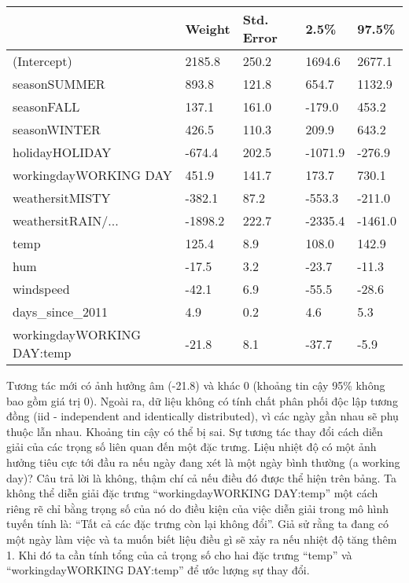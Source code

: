 \begin{table*}[!hbt]
\centering
\begin{tabular}{|l|l|l|l|l|}
\hline
                           & Weight  & Std. Error & 2.5\%   & 97.5\%  \\ \hline
(Intercept)                & 2185.8  & 250.2      & 1694.6  & 2677.1  \\ \hline
seasonSUMMER               & 893.8   & 121.8      & 654.7   & 1132.9  \\ \hline
seasonFALL                 & 137.1   & 161.0      & -179.0  & 453.2   \\ \hline
seasonWINTER               & 426.5   & 110.3      & 209.9   & 643.2   \\ \hline
holidayHOLIDAY             & -674.4  & 202.5      & -1071.9 & -276.9  \\ \hline
workingdayWORKING DAY      & 451.9   & 141.7      & 173.7   & 730.1   \\ \hline
weathersitMISTY            & -382.1  & 87.2       & -553.3  & -211.0  \\ \hline
weathersitRAIN/...         & -1898.2 & 222.7      & -2335.4 & -1461.0 \\ \hline
temp                       & 125.4   & 8.9        & 108.0   & 142.9   \\ \hline
hum                        & -17.5   & 3.2        & -23.7   & -11.3   \\ \hline
windspeed                  & -42.1   & 6.9        & -55.5   & -28.6   \\ \hline
days\_since\_2011          & 4.9     & 0.2        & 4.6     & 5.3     \\ \hline
workingdayWORKING DAY:temp & -21.8   & 8.1        & -37.7   & -5.9    \\ \hline
\end{tabular}
\end{table*}

Tương tác mới có ảnh hưởng âm (-21.8) và khác 0 (khoảng tin cậy 95\% không bao gồm giá trị 0). Ngoài ra, dữ liệu không có tính chất phân phối độc lập tương đồng (iid - independent and identically distributed), vì các ngày gần nhau sẽ phụ thuộc lẫn nhau. Khoảng tin cậy có thể bị sai. Sự tương tác thay đổi cách diễn giải của các trọng số liên quan đến một đặc trưng. Liệu nhiệt độ có một ảnh hưởng tiêu cực tới đầu ra nếu ngày đang xét là một ngày bình thường (a working day)? Câu trả lời là không, thậm chí cả nếu điều đó được thể hiện trên bảng. Ta không thể diễn giải đặc trưng ``workingdayWORKING DAY:temp'' một cách riêng rẽ chỉ bằng trọng số của nó do điều kiện của việc diễn giải trong mô hình tuyến tính là: ``Tất cả các đặc trưng còn lại không đổi''.  Giả sử rằng ta đang có một ngày làm việc và ta muốn biết liệu điều gì sẽ xảy ra nếu nhiệt độ tăng thêm 1. Khi đó ta cần tính tổng của cả trọng số cho hai đặc trưng ``temp'' và ``workingdayWORKING DAY:temp'' để ước lượng sự thay đổi. 

